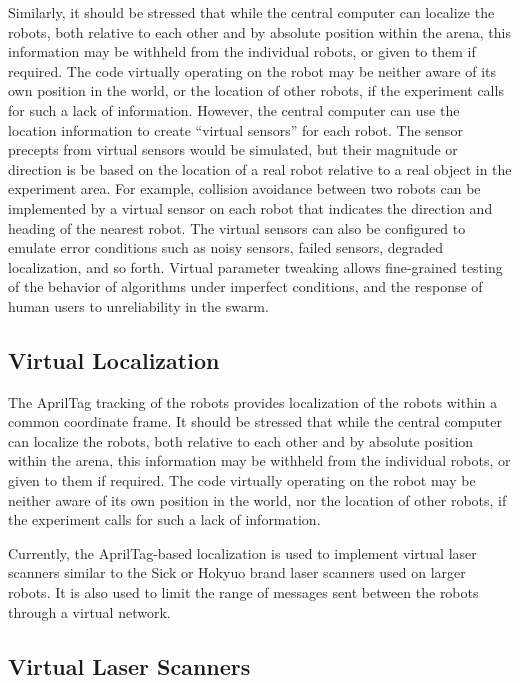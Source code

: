 Similarly, it should be stressed that while the central computer can localize the robots, both relative to each other and by absolute position within the arena, this information may be withheld from the individual robots, or given to them if required. 
The code virtually operating on the robot may be neither aware of its own position in the world, or the location of other robots, if the experiment calls for such a lack of information. 
However, the central computer can use the location information to create ``virtual sensors'' for each robot. 
The sensor precepts from virtual sensors would be simulated, but their magnitude or direction is be based on the location of a real robot relative to a real object in the experiment area. 
For example, collision avoidance between two robots can be implemented by a virtual sensor on each robot that indicates the direction and heading of the nearest robot. 
The virtual sensors can also be configured to emulate error conditions such as noisy sensors, failed sensors, degraded localization, and so forth.
Virtual parameter tweaking allows fine-grained testing of the behavior of algorithms under imperfect conditions, and the response of human users to unreliability in the swarm. 

\subsection{Virtual Localization}

The AprilTag tracking of the robots provides localization of the robots within a common coordinate frame. 
It should be stressed that while the central computer can localize the robots, both relative to each other and by absolute position within the arena, this information may be withheld from the individual robots, or given to them if required. 
The code virtually operating on the robot may be neither aware of its own position in the world, nor the location of other robots, if the experiment calls for such a lack of information. 

Currently, the AprilTag-based localization is used to implement virtual laser scanners similar to the Sick or Hokyuo brand laser scanners used on larger robots. 
It is also used to limit the range of messages sent between the robots through a virtual network. 

\subsection{Virtual Laser Scanners}

